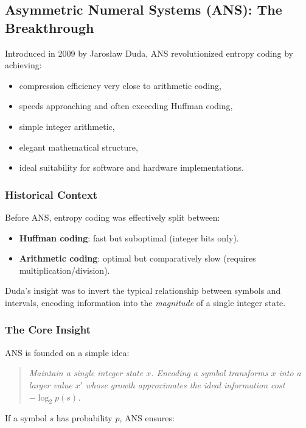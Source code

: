 \subsection{Asymmetric Numeral Systems (ANS): The Breakthrough}

Introduced in 2009 by Jarosław Duda, ANS revolutionized entropy coding by achieving:

\begin{itemize}
    \item compression efficiency very close to arithmetic coding,
    \item speeds approaching and often exceeding Huffman coding,
    \item simple integer arithmetic,
    \item elegant mathematical structure,
    \item ideal suitability for software and hardware implementations.
\end{itemize}

\subsubsection{Historical Context}

Before ANS, entropy coding was effectively split between:

\begin{itemize}
    \item \textbf{Huffman coding}: fast but suboptimal (integer bits only).
    \item \textbf{Arithmetic coding}: optimal but comparatively slow (requires multiplication/division).
\end{itemize}

Duda's insight was to invert the typical relationship between symbols and intervals, encoding information into the \emph{magnitude} of a single integer state.

\subsubsection{The Core Insight}

ANS is founded on a simple idea:

\begin{quote}
\emph{Maintain a single integer state $x$.  
Encoding a symbol transforms $x$ into a larger value $x'$ whose growth approximates the ideal information cost $-\log_2 p(s)$.}
\end{quote}

If a symbol $s$ has probability $p$, ANS ensures:


